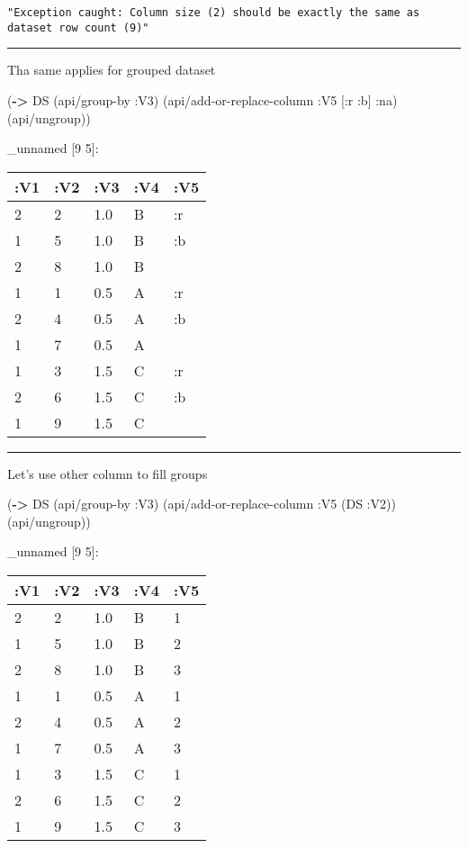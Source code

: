 \documentclass[]{article}
\newenvironment{Shaded}{\begin{snugshade}}{\end{snugshade}}
\newcommand{\AttributeTok}[1]{\textcolor[rgb]{0.77,0.63,0.00}{#1}}
\newcommand{\KeywordTok}[1]{\textcolor[rgb]{0.13,0.29,0.53}{\textbf{#1}}}
\newcommand{\NormalTok}[1]{#1}
\begin{document}
\begin{verbatim}
"Exception caught: Column size (2) should be exactly the same as dataset row count (9)"
\end{verbatim}

\begin{center}\rule{0.5\linewidth}{0.5pt}\end{center}

Tha same applies for grouped dataset

\begin{Shaded}
\begin{Highlighting}[]
\NormalTok{(}\KeywordTok{->}\NormalTok{ DS}
\NormalTok{    (api/group-by }\AttributeTok{:V3}\NormalTok{)}
\NormalTok{    (api/add-or-replace-column }\AttributeTok{:V5}\NormalTok{ [}\AttributeTok{:r} \AttributeTok{:b}\NormalTok{] }\AttributeTok{:na}\NormalTok{)}
\NormalTok{    (api/ungroup))}
\end{Highlighting}
\end{Shaded}

\_unnamed {[}9 5{]}:

\begin{longtable}[]{@{}lllll@{}}
\toprule
:V1 & :V2 & :V3 & :V4 & :V5\tabularnewline
\midrule
\endhead
2 & 2 & 1.0 & B & :r\tabularnewline
1 & 5 & 1.0 & B & :b\tabularnewline
2 & 8 & 1.0 & B &\tabularnewline
1 & 1 & 0.5 & A & :r\tabularnewline
2 & 4 & 0.5 & A & :b\tabularnewline
1 & 7 & 0.5 & A &\tabularnewline
1 & 3 & 1.5 & C & :r\tabularnewline
2 & 6 & 1.5 & C & :b\tabularnewline
1 & 9 & 1.5 & C &\tabularnewline
\bottomrule
\end{longtable}

\begin{center}\rule{0.5\linewidth}{0.5pt}\end{center}

Let's use other column to fill groups

\begin{Shaded}
\begin{Highlighting}[]
\NormalTok{(}\KeywordTok{->}\NormalTok{ DS}
\NormalTok{    (api/group-by }\AttributeTok{:V3}\NormalTok{)}
\NormalTok{    (api/add-or-replace-column }\AttributeTok{:V5}\NormalTok{ (DS }\AttributeTok{:V2}\NormalTok{))}
\NormalTok{    (api/ungroup))}
\end{Highlighting}
\end{Shaded}

\_unnamed {[}9 5{]}:

\begin{longtable}[]{@{}lllll@{}}
\toprule
:V1 & :V2 & :V3 & :V4 & :V5\tabularnewline
\midrule
\endhead
2 & 2 & 1.0 & B & 1\tabularnewline
1 & 5 & 1.0 & B & 2\tabularnewline
2 & 8 & 1.0 & B & 3\tabularnewline
1 & 1 & 0.5 & A & 1\tabularnewline
2 & 4 & 0.5 & A & 2\tabularnewline
1 & 7 & 0.5 & A & 3\tabularnewline
1 & 3 & 1.5 & C & 1\tabularnewline
2 & 6 & 1.5 & C & 2\tabularnewline
1 & 9 & 1.5 & C & 3\tabularnewline
\bottomrule
\end{longtable}
\end{document}
